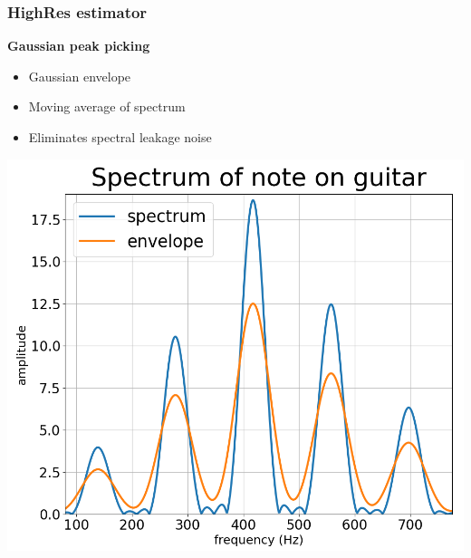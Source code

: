 \documentclass[table]{beamer}
\begin{document}


\begin{frame}
\frametitle{HighRes estimator}
    \large{\textbf{Gaussian peak picking}}
    \begin{itemize}
        \item Gaussian envelope
        \item Moving average of spectrum
        \item Eliminates spectral leakage noise
    \end{itemize}
    \smallskip
    \smallskip

    \hspace{+3mm}\includegraphics[width=0.47\linewidth]{figures/gaus_spec.png}

\end{frame}
\end{document}
